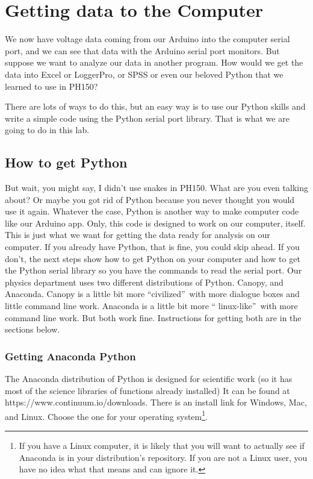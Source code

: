 \chapter{Getting data to the Computer}
We now have voltage data coming from our Arduino into the computer serial
port, and we can see that data with the Arduino serial port monitors. But
suppose we want to analyze our data in another program. How would we get the
data into Excel or LoggerPro, or SPSS or even our beloved Python that we
learned to use in PH150?

There are lots of ways to do this, but an easy way is to use our Python
skills and write a simple code using the Python serial port library. That is
what we are going to do in this lab.

\section{How to get Python}

But wait, you might say, I didn't use snakes in PH150. What are you even
talking about? Or maybe you got rid of Python because you never thought you
would use it again. Whatever the case, Python is another way to make
computer code like our Arduino app. Only, this code is designed to work on
our computer, itself. This is just what we want for getting the data ready
for analysis on our computer. If you already have Python, that is fine, you
could skip ahead. If you don't, the next steps show how to get Python on
your computer and how to get the Python serial library so you have the
commands to read the serial port. Our physics department uses two different
distributions of Python. Canopy, and Anaconda. Canopy is a little bit more
\textquotedblleft civilized\textquotedblright\ with more dialogue boxes and
little command line work. Anaconda is a little bit more \textquotedblleft
linux-like\textquotedblright\ with more command line work. But both work
fine. Instructions for getting both are in the sections below.

\subsection{Getting Anaconda Python}

The Anaconda distribution of Python is designed for scientific work (so it
has most of the science libraries of functions already installed) It can be
found at https://www.continuum.io/downloads. There is an install link for
Windows, Mac, and Linux. Choose the one for your operating system\footnote{%
If you have a Linux computer, it is likely that you will want to actually
see if Anaconda is in your distribution's repository. If you are not a Linux
user, you have no idea what that means and can ignore it.}.

